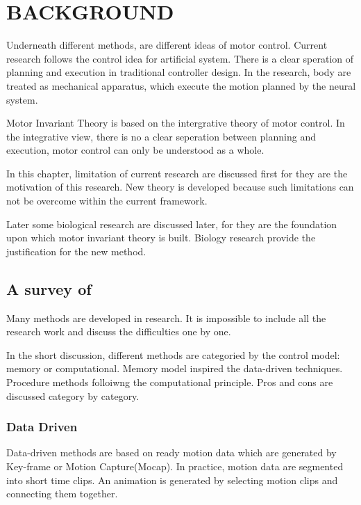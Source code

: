 \chapter{BACKGROUND}
\label{chap:background}

Underneath different \cms methods, are different ideas of motor control.
Current \cms research follows the control idea for artificial system.
There is a clear speration of planning and execution in traditional controller design.
In the \cms research, body are treated as mechanical apparatus, which execute the motion planned by the neural system.

Motor Invariant Theory is based on the intergrative theory of motor control\citep{dickinson2000animals}.
In the integrative view, there is no a clear seperation between planning and execution,  motor control can only be understood as a whole.

In this chapter, limitation of current \cms research are discussed first for they are the motivation of this research.
New theory is developed because such limitations can not be overcome within the current framework.

Later some biological research are discussed later, for they are the foundation upon which motor invariant theory is built.
Biology research provide the justification for the new \cms method.



\section{A survey of \cms}

Many methods are developed in \cms research.
It is impossible to include all the research work and discuss the difficulties one by one.

In the short discussion, different \cms methods are categoried by the control model: memory or computational.
Memory model inspired the data-driven techniques.
Procedure methods folloiwng the computational principle.
Pros and cons are discussed category by category.

\subsection{Data Driven}
Data-driven methods are based on ready motion data which are generated by Key-frame or Motion Capture(Mocap). 
In practice, motion data are segmented into short time clips. 
An animation is generated by selecting motion clips and connecting them together\citep{Parent2002,kovar2003flexible}.

